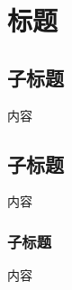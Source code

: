 \documentclass{article}
\begin{document}
\begin{titlepage}
\vspace*{140pt}
\vspace*{50pt}
\thispagestyle{empty}
\end{titlepage}
\renewcommand{\contentsname}{目\quad 录}
\tableofcontents
\clearpage

\section{标题}
\subsection{子标题}
内容
\subsection{子标题}
内容
\subsubsection{子标题}
内容
\end{document}
